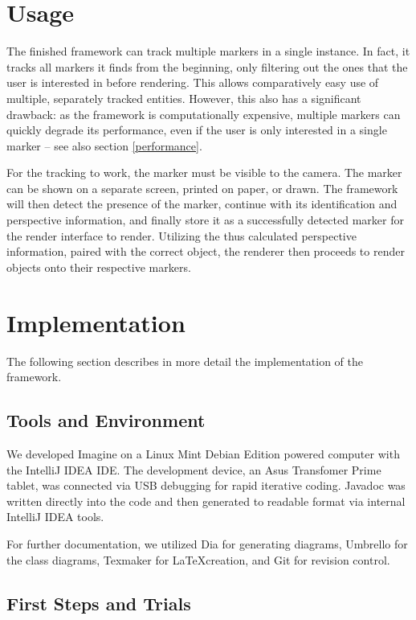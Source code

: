 \section{Usage}

The finished framework can track multiple markers in a single instance.
In fact, it tracks all markers it finds from the beginning, only filtering out the ones that the user is interested in before rendering.
This allows comparatively easy use of multiple, separately tracked entities.
However, this also has a significant drawback: as the framework is computationally expensive, multiple markers can quickly degrade its performance, even if the user is only interested in a single marker – see also section \ref{performance}.

For the tracking to work, the marker must be visible to the camera.
The marker can be shown on a separate screen, printed on paper, or drawn.
The framework will then detect the presence of the marker, continue with its identification and perspective information, and finally store it as a successfully detected marker for the render interface to render.
Utilizing the thus calculated perspective information, paired with the correct object, the renderer then proceeds to render objects onto their respective markers.

\section{Implementation}

The following section describes in more detail the implementation of the framework.

\subsection{Tools and Environment}

We developed Imagine on a Linux Mint Debian Edition powered computer with the IntelliJ IDEA IDE\cite{idea}.
The development device, an Asus Transfomer Prime tablet, was connected via USB debugging for rapid iterative coding.
Javadoc was written directly into the code and then generated to readable format via internal IntelliJ IDEA tools.

For further documentation, we utilized Dia\cite{dia} for generating diagrams, Umbrello\cite{umbrello} for the class diagrams, Texmaker\cite{texmaker} for \LaTeX creation, and Git\cite{git} for revision control.

\subsection{First Steps and Trials}

